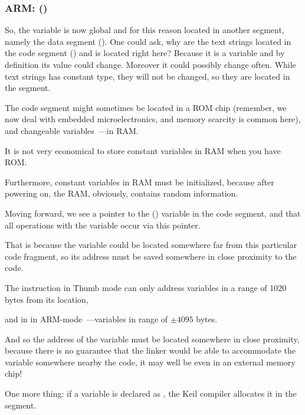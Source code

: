 \subsubsection{ARM: \OptimizingKeilVI (\ThumbMode)}



So, the  variable is now global and for this reason located in another segment, namely the data segment ().
One could ask, why are the text strings located in the code segment () and  is located right here?
Because it is a variable and by definition its value could change. Moreover it could possibly change often.
While text strings has constant type, they will not be changed, so they are located in the  segment.
\myindex{\RAM}
\myindex{\ROM}

The code segment might sometimes be located in a \ac{ROM} chip (remember, we now deal
with embedded microelectronics, and memory scarcity is common here), and changeable 
variables~---in \ac{RAM}.

It is not very economical to store constant variables in RAM when you have ROM.

Furthermore, constant variables in RAM must be initialized, because after powering on, the RAM, obviously, contains random information.


Moving forward, we see a pointer to the  () variable in the code segment, and that all
operations with the variable occur via this pointer.

That is because the  variable could be located somewhere far from this particular code fragment, so its address
must be saved somewhere in close proximity to the code.

The  instruction in Thumb mode can only address variables in a range of 1020 bytes from its location, 

and in in ARM-mode~---variables in range of $\pm{}4095$ bytes.

And so the address of the  variable
must be located somewhere in close proximity, because there is no guarantee that the linker would be able to accommodate the variable somewhere nearby the code, it may well be even in an external memory chip!

\myindex{\ROM}

One more thing: if a variable is declared as , the Keil compiler allocates it in 
the  segment.

